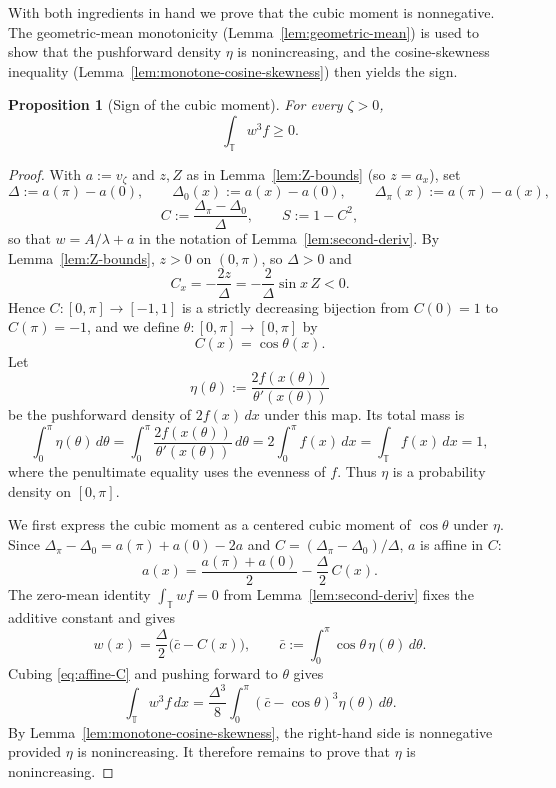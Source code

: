 \documentclass{amsart}
\newtheorem{proposition}[theorem]{Proposition}
\newcommand{\T}{\mathbb T}
\begin{document}
With both ingredients in hand we prove that the cubic moment is nonnegative.
The geometric-mean monotonicity (Lemma~\ref{lem:geometric-mean}) is
used to show that the pushforward density $\eta$ is nonincreasing, and
the cosine-skewness inequality (Lemma~\ref{lem:monotone-cosine-skewness})
then yields the sign.

\begin{proposition}[Sign of the cubic moment]\label{prop:cubic}
For every $\zeta>0$,
\[
\int_\T w^3 f\geq 0.
\]
\end{proposition}
\begin{proof}
With $a:=v_\zeta$ and $z, Z$ as in Lemma~\ref{lem:Z-bounds} (so $z=a_x$), set
\[
\Delta:=a(\pi)-a(0),\qquad
\Delta_0(x):=a(x)-a(0),\qquad \Delta_\pi(x):=a(\pi)-a(x),
\]
\[
C:=\frac{\Delta_\pi-\Delta_0}{\Delta},\qquad S:=1-C^2,
\]
so that $w=A/\lambda+a$ in the notation of Lemma~\ref{lem:second-deriv}.
By Lemma~\ref{lem:Z-bounds}, $z>0$ on $(0,\pi)$, so $\Delta>0$ and
\begin{equation}\label{eq:Cx-formula}
C_x=-\frac{2z}{\Delta}=-\frac{2}{\Delta}\sin x\,Z<0.
\end{equation}
Hence $C\colon[0,\pi]\to[-1,1]$ is a strictly
decreasing bijection from $C(0)=1$ to $C(\pi)=-1$, and we define
$\theta\colon[0,\pi]\to[0,\pi]$ by
\[
C(x)=\cos\theta(x).
\]
Let
\[
\eta(\theta):=\frac{2f(x(\theta))}{\theta'(x(\theta))}
\]
be the pushforward density of $2f(x)\,dx$ under this map. Its total mass is
\[
\int_0^\pi \eta(\theta)\,d\theta
=\int_0^\pi \frac{2f(x(\theta))}{\theta'(x(\theta))}\,d\theta
=2\int_0^\pi f(x)\,dx
=\int_\T f(x)\,dx=1,
\]
where the penultimate equality uses the evenness of $f$. Thus $\eta$ is
a probability density on $[0,\pi]$.

We first express the cubic moment as a centered cubic moment of
$\cos\theta$ under $\eta$. Since
$\Delta_\pi-\Delta_0=a(\pi)+a(0)-2a$ and $C=(\Delta_\pi-\Delta_0)/\Delta$, $a$ is affine in
$C$:
\[
a(x)=\frac{a(\pi)+a(0)}{2}-\frac{\Delta}{2}\,C(x) .
\]
The zero-mean identity $\int_\T wf=0$ from
Lemma~\ref{lem:second-deriv} fixes the additive constant and gives
\begin{equation}\label{eq:affine-C}
w(x)=\frac{\Delta}{2}\bigl(\bar c-C(x)\bigr),\qquad
\bar c:=\int_0^\pi\cos\theta\,\eta(\theta)\,d\theta .
\end{equation}
Cubing \eqref{eq:affine-C} and pushing forward to $\theta$ gives
\[
\int_\T w^3 f\,dx
=\frac{\Delta^3}{8}\int_0^\pi(\bar c-\cos\theta)^3\eta(\theta)\,d\theta .
\]
By Lemma~\ref{lem:monotone-cosine-skewness}, the right-hand side is
nonnegative provided $\eta$ is nonincreasing. It therefore remains to
prove that $\eta$ is nonincreasing.


\end{proof}
\end{document}

